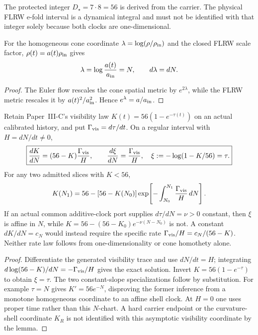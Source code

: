 \documentclass[12pt,a4paper]{article}
\begin{document}
The protected integer \(D_\star=7\cdot8=56\) is derived from the carrier.  The physical FLRW e-fold interval is a dynamical integral and must not be identified with that integer solely because both clocks are one-dimensional.

\begin{lemma}
\label{p8:lem:cone-homothety-efold}
For the homogeneous cone coordinate \(\lambda=\log(\rho/\rho_{\rm in})\) and the closed FLRW scale factor, \(\rho(t)=a(t)\rho_{\rm in}\) gives
\[
\lambda=\log\frac{a(t)}{a_{\rm in}}=N,
\qquad d\lambda=dN.
\]
\end{lemma}

\begin{proof}
The Euler flow rescales the cone spatial metric by \(e^{2\lambda}\), while the FLRW metric rescales it by \(a(t)^2/a_{\rm in}^2\).  Hence \(e^\lambda=a/a_{\rm in}\).
\end{proof}

\begin{lemma}
\label{p8:lem:shell-calibration-homothety}
Retain Paper~III-C's visibility law
$K(t)=56(1-e^{-\tau(t)})$ on an actual calibrated history, and put
$\Gamma_{\rm vis}=d\tau/dt$. On a regular interval with $H=dN/dt\ne0$,
\begin{equation}
\label{p8:eq:v2211-exact-shell-efold-rate}
 \boxed{\frac{dK}{dN}=(56-K)\frac{\Gamma_{\rm vis}}{H},\qquad
 \frac{d\xi}{dN}=\frac{\Gamma_{\rm vis}}H,
 \quad \xi:=-\log(1-K/56)=\tau.}
\end{equation}
For any two admitted slices with $K<56$,
\[
 K(N_1)=56-[56-K(N_0)]
 \exp\!\left[-\int_{N_0}^{N_1}\frac{\Gamma_{\rm vis}}H\,dN\right].
\]
If an actual common additive-clock port supplies
$d\tau/dN=\nu>0$ constant, then $\xi$ is affine in $N$, while
$K=56-(56-K_0)e^{-\nu(N-N_0)}$ is not. A constant
$dK/dN=c_N$ would instead require the specific rate
$\Gamma_{\rm vis}/H=c_N/(56-K)$. Neither rate law follows from
one-dimensionality or cone homothety alone.
\end{lemma}
\begin{proof}
Differentiate the generated visibility trace and use $dN/dt=H$;
integrating $d\log(56-K)/dN=-\Gamma_{\rm vis}/H$ gives the exact
solution. Invert $K=56(1-e^{-\tau})$ to obtain $\xi=\tau$.
The two constant-slope specializations follow by substitution. For
example $\tau=N$ gives $K'=56e^{-N}$, disproving the former inference
from a monotone homogeneous coordinate to an affine shell clock.
At $H=0$ one uses proper time rather than this $N$-chart. A hard carrier
endpoint or the curvature-shell coordinate $K_R$ is not identified with
this asymptotic visibility coordinate by the lemma.
\end{proof}
\end{document}
